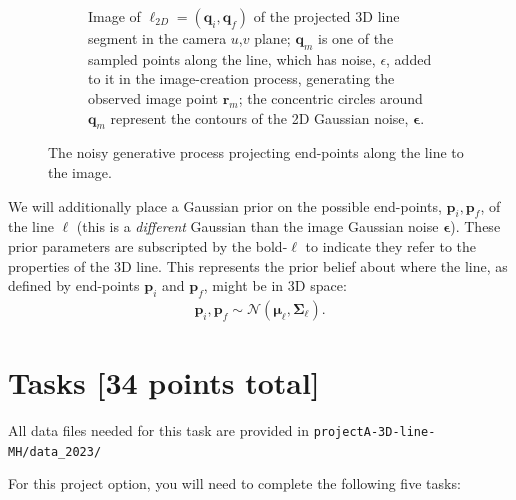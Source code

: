 \documentclass[10pt]{article}
\begin{document}
\begin{figure}
\begin{subfigure}{.4\textwidth}
  \caption{Image of $\boldsymbol{\ell}_{2D} = (\mathbf{q}_i, \mathbf{q}_f)$ of the projected 3D line segment in the camera $u$,$v$ plane; $\mathbf{q}_m$ is one of the sampled points along the line, which has noise, $\epsilon$, added to it in the image-creation process, generating the observed image point $\mathbf{r}_m$; the concentric circles around $\mathbf{q}_m$ represent the contours of the 2D Gaussian noise, $\boldsymbol{\epsilon}$.}
  \label{fig:2d}
\end{subfigure}
\caption{The noisy generative process projecting end-points along the line to the image\label{fig:line-gen}.}
\end{figure}

We will additionally place a Gaussian prior on the possible end-points, $\mathbf{p}_i, \mathbf{p}_f$, of the line $\boldsymbol{\ell}$ (this is a {\em different} Gaussian than the image Gaussian noise $\boldsymbol{\epsilon}$).  These prior parameters are subscripted by the bold-$\boldsymbol{\ell}$ to indicate they refer to the properties of the 3D line.  This represents the prior belief about where the line, as defined by end-points $\mathbf{p}_i$ and $\mathbf{p}_f$, might be in 3D space:
\begin{eqnarray*}
\mathbf{p}_i, \mathbf{p}_f \sim \mathcal{N}(\boldsymbol{\mu}_{\boldsymbol{\ell}}, \boldsymbol{\Sigma}_{\boldsymbol{\ell}}) .
\end{eqnarray*}

\newpage
\section*{Tasks [34 points total]}


All data files needed for this task are provided in {\tt projectA-3D-line-MH/data\_2023/}

For this project option, you will need to complete the following five tasks:
\end{document}
